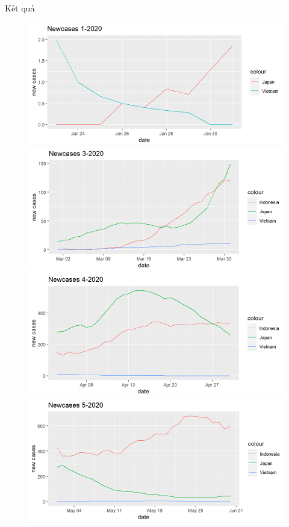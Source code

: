 \documentclass[a4paper]{article}
\theoremstyle{definition}
\begin{document}
\begin{enumerate}[1)]
	Kết quả
	\begin{figure}[H]
	    \begin{center}
	        \includegraphics[scale=0.5]{vi/nc_1_2020}
	        \includegraphics[scale=0.5]{vi/nc_3_2020}
    		\includegraphics[scale=0.5]{vi/nc_4_2020}
    		\includegraphics[scale=0.5]{vi/nc_5_2020}

\end{center}
\end{figure}
\end{enumerate}
\end{document}
